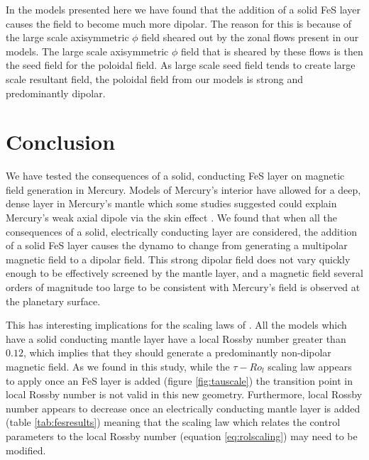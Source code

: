 In the models presented here we have found that the addition of a solid FeS layer causes the field to become much more dipolar. The reason for this is because of the large scale axisymmetric $\phi$ field sheared out by the zonal flows present in our models. The large scale axisymmetric $\phi$ field that is sheared by these flows is then the seed field for the poloidal field. As large scale seed field tends to create large scale resultant field, the poloidal field from our models is strong and predominantly dipolar.

\section{Conclusion}
We have tested the consequences of a solid, conducting FeS layer on magnetic field generation in Mercury. Models of Mercury's interior have allowed for a deep, dense layer in Mercury's mantle which some studies \citep{smith2012, hauck2013} suggested could explain Mercury's weak axial dipole via the skin effect \citep{christensen06}. We found that when all the consequences of a solid, electrically conducting layer are considered, the addition of a solid FeS layer causes the dynamo to change from generating a multipolar magnetic field to a dipolar field. This strong dipolar field does not vary quickly enough to be effectively screened by the mantle layer, and a magnetic field several orders of magnitude too large to be consistent with Mercury's field is observed at the planetary surface.

This has interesting implications for the scaling laws of \citet{christensen06scaling}. All the models which have a solid conducting mantle layer have a local Rossby number greater than $0.12$, which implies that they should generate a predominantly non-dipolar magnetic field. As we found in this study, while the $\tau-Ro_l$ scaling law appears to apply once an FeS layer is added (figure \ref{fig:tauscale}) the transition point in local Rossby number is not valid in this new geometry. Furthermore, local Rossby number appears to decrease once an electrically conducting mantle layer is added (table \ref{tab:fesresults}) meaning that the scaling law which relates the control parameters to the local Rossby number (equation \ref{eq:rolscaling}) may need to be modified. 

